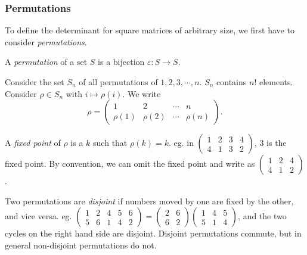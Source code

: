 \documentclass[a4paper]{article}
\begin{document}
\subsubsection{Permutations}
To define the determinant for square matrices of arbitrary size, we first have to consider \emph{permutations}.

\begin{defi}[Permutation]
  A \emph{permutation} of a set $S$ is a bijection $\varepsilon: S\to S$.
\end{defi}

\begin{notation}
  Consider the set $S_n$ of all permutations of $1, 2, 3, \cdots , n$. $S_n$ contains $n!$ elements. Consider $\rho\in S_n$ with $i \mapsto \rho(i)$. We write
  \[
    \rho = \begin{pmatrix} 1 & 2 & \cdots & n\\ \rho(1) & \rho (2) &\cdots & \rho (n)\end{pmatrix}.
  \]
\end{notation}

\begin{defi}
  A \emph{fixed point} of $\rho$ is a $k$ such that $\rho(k) = k$. eg. in $\begin{pmatrix} 1 & 2 & 3 & 4\\4 & 1 & 3 & 2\end{pmatrix}$, $3$ is the fixed point. By convention, we can omit the fixed point and write as $\begin{pmatrix} 1 & 2 & 4\\ 4 & 1 & 2\end{pmatrix}$.
\end{defi}

\begin{defi}
  Two permutations are \emph{disjoint} if numbers moved by one are fixed by the other, and vice versa.  eg. $\begin{pmatrix} 1 & 2 & 4 & 5 & 6\\ 5 & 6 & 1 & 4 & 2\end{pmatrix} = \begin{pmatrix}2 & 6\\ 6& 2\end{pmatrix}\begin{pmatrix}1 & 4 & 5\\5 & 1 & 4\end{pmatrix}$, and the two cycles on the right hand side are disjoint. Disjoint permutations commute, but in general non-disjoint permutations do not.
\end{defi}
\end{document}
